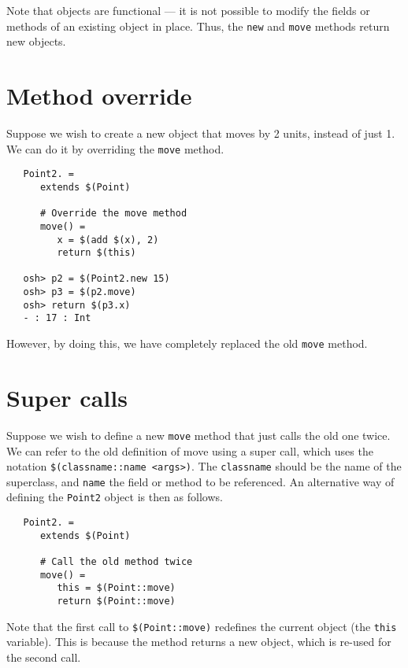 Note that objects are functional --- it is not possible to modify the fields
or methods of an existing object in place.  Thus, the \verb+new+ and \verb+move+
methods return new objects.

\section{Method override}

Suppose we wish to create a new object that moves by 2 units, instead of
just 1.  We can do it by overriding the \verb+move+ method.

\begin{verbatim}
   Point2. =
      extends $(Point)

      # Override the move method
      move() =
         x = $(add $(x), 2)
         return $(this)

   osh> p2 = $(Point2.new 15)
   osh> p3 = $(p2.move)
   osh> return $(p3.x)
   - : 17 : Int
\end{verbatim}

However, by doing this, we have completely replaced the old \verb+move+ method.

\section{Super calls}

Suppose we wish to define a new \verb+move+ method that just calls the old one twice.
We can refer to the old definition of move using a super call, which uses the notation
\verb+$(classname::name <args>)+.  The \verb+classname+ should be the name of the
superclass, and \verb+name+ the field or method to be referenced.  An alternative
way of defining the \verb+Point2+ object is then as follows.

\begin{verbatim}
   Point2. =
      extends $(Point)

      # Call the old method twice
      move() =
         this = $(Point::move)
         return $(Point::move)
\end{verbatim}

Note that the first call to \verb+$(Point::move)+ redefines the
current object (the \verb+this+ variable).  This is because the method
returns a new object, which is re-used for the second call.

